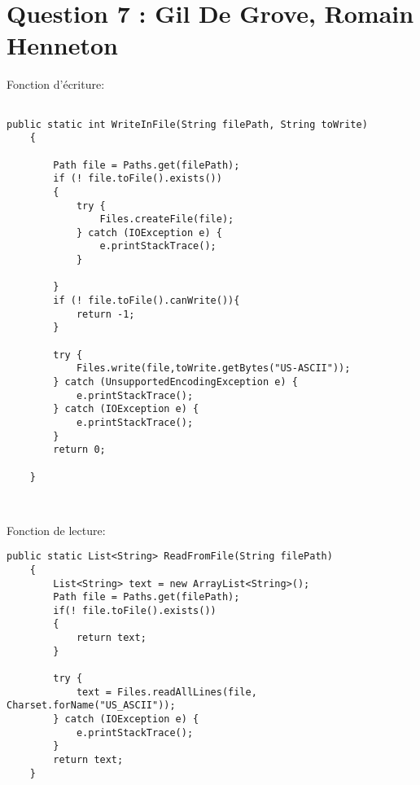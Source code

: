 \section*{Question 7 : Gil De Grove, Romain Henneton}
Fonction d'écriture:\\
\begin{lstlisting}

public static int WriteInFile(String filePath, String toWrite)
	{

		Path file = Paths.get(filePath);
		if (! file.toFile().exists())
		{
			try {		
				Files.createFile(file);
			} catch (IOException e) {
				e.printStackTrace();
			}

		}	
		if (! file.toFile().canWrite()){		
			return -1;
		}

		try {
			Files.write(file,toWrite.getBytes("US-ASCII"));
		} catch (UnsupportedEncodingException e) {
			e.printStackTrace();
		} catch (IOException e) {
			e.printStackTrace();
		}
		return 0;

	}



\end{lstlisting}

Fonction de lecture: \\
\begin{lstlisting}
public static List<String> ReadFromFile(String filePath)
	{
		List<String> text = new ArrayList<String>();
		Path file = Paths.get(filePath);
		if(! file.toFile().exists())
		{
			return text;
		}

		try {
			text = Files.readAllLines(file, Charset.forName("US_ASCII"));
		} catch (IOException e) {
			e.printStackTrace();
		}
		return text;
	}
	\end{lstlisting}